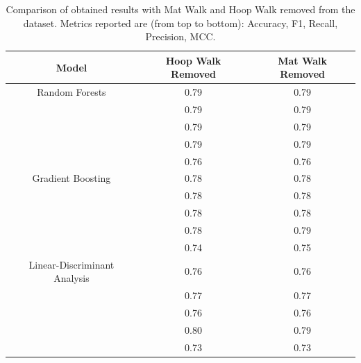                 \begin{table}[htbp]
                    \centering
                    \begin{tabular}{|c|c|c|}
                    \hline
                    \textbf{Model} & \textbf{Hoop Walk Removed} & \textbf{Mat Walk Removed} \\ \hline
                        Random Forests                   & 0.79 & 0.79 \\ 
                                                        & 0.79 & 0.79 \\ 
                                                        & 0.79 & 0.79 \\ 
                                                        & 0.79 & 0.79 \\
                                                        & 0.76 & 0.76 \\ 
                                                        \hline
                        Gradient Boosting               & 0.78 & 0.78 \\ 
                                                        & 0.78 & 0.78 \\ 
                                                        & 0.78 & 0.78 \\ 
                                                        & 0.78 & 0.79 \\
                                                        & 0.74 & 0.75 \\
                                                        \hline
                        Linear-Discriminant Analysis    & 0.76 & 0.76 \\ 
                                                        & 0.77 & 0.77 \\ 
                                                        & 0.76 & 0.76 \\
                                                        & 0.80 & 0.79 \\ 
                                                        & 0.73 & 0.73 \\ 
                                                        \hline
                    \end{tabular}
                    \caption{Comparison of obtained results with Mat Walk and Hoop Walk removed from the dataset. Metrics reported are (from top to bottom): Accuracy, F1, Recall, Precision, MCC.}
                    \label{tab:correct_approach_mat_hoop} 
                \end{table}
           \newpage 

